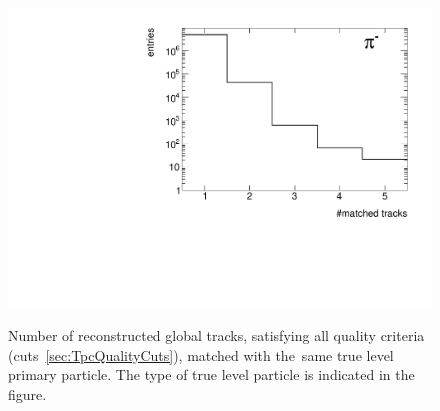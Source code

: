 \begin{figure}[ht]
{		\includegraphics[width=\linewidth,page=6]{graphics/eff/trackSplitting_CD.pdf}\\
	}%
	\caption[Number of reconstructed global tracks, satisfying all quality criteria, matched with the same true level primary particle.]{Number of reconstructed global tracks, satisfying all quality criteria (cuts~\ref{sec:TpcQualityCuts}), matched with the~same true level primary particle. The type of true level particle is indicated in the figure.}\label{fig:trackSplittingNominal}
\end{figure}

